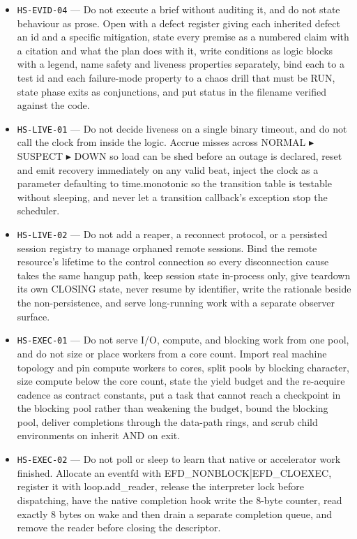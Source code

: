 \documentclass[11pt]{article}
\begin{document}
\begin{itemize}
  \item \texttt{HS-EVID-04} --- Do not execute a brief without auditing it, and do not state behaviour as prose. Open with a defect register giving each inherited defect an id and a specific mitigation, state every premise as a numbered claim with a citation and what the plan does with it, write conditions as logic blocks with a legend, name safety and liveness properties separately, bind each to a test id and each failure-mode property to a chaos drill that must be RUN, state phase exits as conjunctions, and put status in the filename verified against the code. %
  \item \texttt{HS-LIVE-01} --- Do not decide liveness on a single binary timeout, and do not call the clock from inside the logic. Accrue misses across NORMAL ▸ SUSPECT ▸ DOWN so load can be shed before an outage is declared, reset and emit recovery immediately on any valid beat, inject the clock as a parameter defaulting to time.monotonic so the transition table is testable without sleeping, and never let a transition callback's exception stop the scheduler. %
  \item \texttt{HS-LIVE-02} --- Do not add a reaper, a reconnect protocol, or a persisted session registry to manage orphaned remote sessions. Bind the remote resource's lifetime to the control connection so every disconnection cause takes the same hangup path, keep session state in-process only, give teardown its own CLOSING state, never resume by identifier, write the rationale beside the non-persistence, and serve long-running work with a separate observer surface. %
  \item \texttt{HS-EXEC-01} --- Do not serve I/O, compute, and blocking work from one pool, and do not size or place workers from a core count. Import real machine topology and pin compute workers to cores, split pools by blocking character, size compute below the core count, state the yield budget and the re-acquire cadence as contract constants, put a task that cannot reach a checkpoint in the blocking pool rather than weakening the budget, bound the blocking pool, deliver completions through the data-path rings, and scrub child environments on inherit AND on exit. %
  \item \texttt{HS-EXEC-02} --- Do not poll or sleep to learn that native or accelerator work finished. Allocate an eventfd with EFD\_NONBLOCK|EFD\_CLOEXEC, register it with loop.add\_reader, release the interpreter lock before dispatching, have the native completion hook write the 8-byte counter, read exactly 8 bytes on wake and then drain a separate completion queue, and remove the reader before closing the descriptor. %

\end{itemize}
\end{document}
